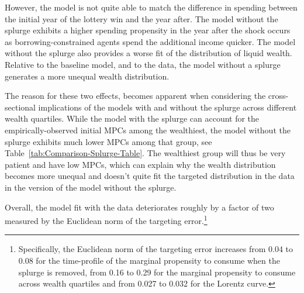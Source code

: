\documentclass[qe]{econsocart}
\begin{document}
However, the model is not quite able to match the difference in spending between the initial year of the lottery win and the year after.
The model without the splurge exhibits a higher spending propensity in the year after the shock occurs as borrowing-constrained agents spend the additional income quicker.
The model without the splurge also provides a worse fit of the distribution of liquid wealth.
Relative to the baseline model, and to the data, the model without a splurge generates a more unequal wealth distribution.

The reason for these two effects, becomes apparent when considering the cross-sectional implications of the models with and without the splurge across different wealth quartiles.
While the model with the splurge can account for the empirically-observed initial MPCs among the wealthiest, the model without the splurge exhibits much lower MPCs among that group, see Table~\ref{tab:Comparison-Splurge-Table}. The wealthiest group will thus be very patient and have low MPCs, which can explain why the wealth distribution becomes more unequal and doesn't quite fit the targeted distribution in the data in the version of the model without the splurge.

Overall, the model fit with the data deteriorates roughly by a factor of two measured by the Euclidean norm of the targeting error.\footnote{Specifically, the Euclidean norm of the targeting error increases from 0.04 to 0.08 for the time-profile of the marginal propensity to consume when the splurge is removed, from 0.16 to 0.29 for the marginal propensity to consume across wealth quartiles and from 0.027 to 0.032 for the Lorentz curve.}
\end{document}
